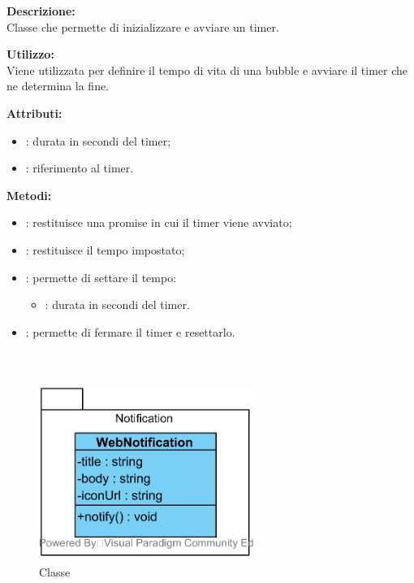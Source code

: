 \textbf{Descrizione:}\\
Classe che permette di inizializzare e avviare un timer.

\textbf{Utilizzo:}\\
Viene utilizzata per definire il tempo di vita di una bubble e avviare il timer che ne determina la fine.



\textbf{Attributi:}
\begin{itemize}
	\item {}: durata in secondi del timer;
	\item {}: riferimento al timer.
\end{itemize}

\textbf{Metodi:}
\begin{itemize}
	\item {}: restituisce una promise in cui il timer viene avviato;
	\item {}: restituisce il tempo impostato;
	\item {}: permette di settare il tempo:
	\begin{itemize}
		\item {}: durata in secondi del timer.
	\end{itemize}
	\item {}: permette di fermare il timer e resettarlo.
\end{itemize}

\subparagraph[::Notification::WebNotification]{\class}\mbox{}\\ \label{\class}
\begin{figure}[H]
	\centering
	\includegraphics[width=7cm]{./diagrammi/framework/model/api/notification.png}
	\caption{Classe \class}
\end{figure}

